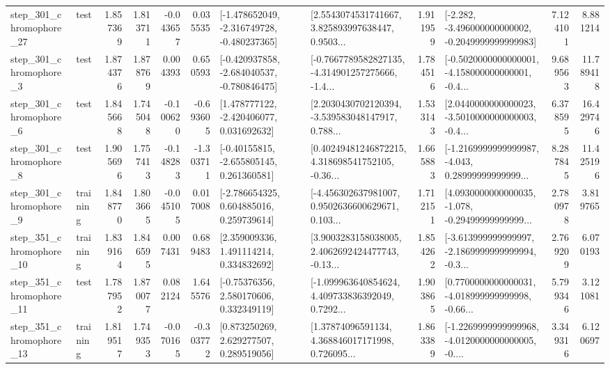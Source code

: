 \begin{tabular}{llrrrrllrlrr}
  step\_301\_chromophore\_27 &      test &      1.857369 &    1.813711 &     -0.043657 &  0.035535 &  [-1.478652049, -2.316749728, -0.480237365] &  [2.5543074531741667, 3.825893997638447, 0.9503... &       1.911959 &  [-2.282, -3.496000000000002, -0.2049999999999983] &            7.124101 &          8.881214 \\
   step\_301\_chromophore\_3 &      test &      1.874376 &    1.878769 &      0.004393 &  0.650593 &  [-0.420937858, -2.684040537, -0.780846475] &  [-0.7667789582827135, -4.314901257275666, -1.4... &       1.784516 &  [-0.5020000000000001, -4.158000000000001, -0.4... &            9.689563 &         11.789418 \\
   step\_301\_chromophore\_6 &      test &      1.845668 &    1.745048 &     -0.100620 & -0.693605 &    [1.478777122, -2.420406077, 0.031692632] &  [2.2030430702120394, -3.539583048147917, 0.788... &       1.533143 &  [2.0440000000000023, -3.5010000000000003, -0.4... &            6.378595 &         16.429746 \\
   step\_301\_chromophore\_8 &      test &      1.905696 &    1.757413 &     -0.148283 & -1.303711 &    [-0.40155815, -2.655805145, 0.261360581] &  [0.40249481246872215, 4.318698541752105, -0.36... &       1.665883 &  [-1.2169999999999987, -4.043, 0.28999999999999... &            8.287845 &         11.425196 \\
   step\_301\_chromophore\_9 &  training &      1.848770 &    1.803665 &     -0.045105 &  0.017008 &    [-2.786654325, 0.604885016, 0.259739614] &  [-4.456302637981007, 0.9502636600629671, 0.103... &       1.712151 &  [4.0930000000000035, -1.078, -0.29499999999999... &            2.780978 &          3.819765 \\
  step\_351\_chromophore\_10 &  training &      1.839164 &    1.846595 &      0.007431 &  0.689483 &     [2.359009336, 1.491114214, 0.334832692] &  [3.9003283158038005, 2.4062692424477743, -0.13... &       1.854262 &  [-3.613999999999997, -2.1869999999999994, -0.3... &            2.769209 &          6.070193 \\
  step\_351\_chromophore\_11 &      test &      1.787952 &    1.870077 &      0.082124 &  1.645576 &     [-0.75376356, 2.580170606, 0.332349119] &  [-1.099963640854624, 4.409733836392049, 0.7292... &       1.903865 &  [0.7700000000000031, -4.018999999999998, -0.66... &            5.799346 &          3.121081 \\
  step\_351\_chromophore\_13 &  training &      1.819517 &    1.749353 &     -0.070165 & -0.303772 &     [0.873250269, 2.629277507, 0.289519056] &  [1.37874096591134, 4.368846017171998, 0.726095... &       1.863389 &  [-1.2269999999999968, -4.0120000000000005, -0.... &            3.349316 &          6.120697 \\

\end{tabular}
